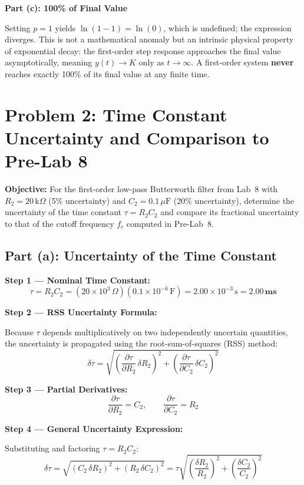 \documentclass[11pt]{article}
\begin{document}
\textbf{Part (c): 100\% of Final Value}

Setting $p = 1$ yields $\ln(1 - 1) = \ln(0)$, which is undefined; the expression diverges. This
is not a mathematical anomaly but an intrinsic physical property of exponential decay: the
first-order step response approaches the final value asymptotically, meaning $y(t) \to K$ only
as $t \to \infty$. A first-order system \textbf{never} reaches exactly 100\% of its final value
at any finite time.

\section*{Problem 2: Time Constant Uncertainty and Comparison to Pre-Lab 8}

\textbf{Objective:} For the first-order low-pass Butterworth filter from Lab~8 with
$R_2 = 20\,\text{k}\Omega$ (5\% uncertainty) and $C_2 = 0.1\,\mu\text{F}$ (20\% uncertainty),
determine the uncertainty of the time constant $\tau = R_2 C_2$ and compare its fractional
uncertainty to that of the cutoff frequency $f_c$ computed in Pre-Lab~8.

\subsection*{Part (a): Uncertainty of the Time Constant}

\textbf{Step 1 --- Nominal Time Constant:}
\[
  \tau = R_2 C_2 = (20 \times 10^3\,\Omega)(0.1 \times 10^{-6}\,\text{F})
  = 2.00 \times 10^{-3}\,\text{s} = \mathbf{2.00\,\text{ms}}
\]

\textbf{Step 2 --- RSS Uncertainty Formula:}

Because $\tau$ depends multiplicatively on two independently uncertain quantities, the uncertainty
is propagated using the root-sum-of-squares (RSS) method:
\[
  \delta\tau = \sqrt{
    \left(\frac{\partial \tau}{\partial R_2}\,\delta R_2\right)^2
    +
    \left(\frac{\partial \tau}{\partial C_2}\,\delta C_2\right)^2
  }
\]

\textbf{Step 3 --- Partial Derivatives:}
\[
  \frac{\partial \tau}{\partial R_2} = C_2, \qquad
  \frac{\partial \tau}{\partial C_2} = R_2
\]

\textbf{Step 4 --- General Uncertainty Expression:}

Substituting and factoring $\tau = R_2 C_2$:
\[
  \delta\tau = \sqrt{(C_2\,\delta R_2)^2 + (R_2\,\delta C_2)^2}
  = \tau\sqrt{
    \left(\frac{\delta R_2}{R_2}\right)^2
    +
    \left(\frac{\delta C_2}{C_2}\right)^2
  }
\]
\end{document}
